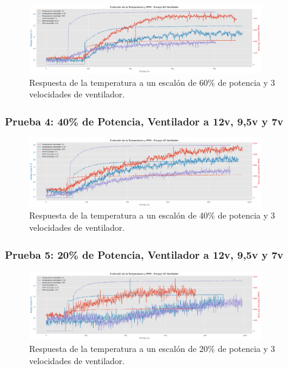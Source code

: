 \documentclass[spanish, a4paper, 11pt]{article}
\begin{document}
\begin{figure}[ht]
    \centering
    \includegraphics[width=0.9\textwidth]{./figures/ventilador_60.png}
    \caption{Respuesta de la temperatura a un escalón de 60\% de potencia y 3 velocidades de ventilador.}
\end{figure}
\FloatBarrier

\subsubsection{Prueba 4: 40\% de Potencia, Ventilador a 12v, 9,5v y 7v}

\begin{figure}[ht]
    \centering
    \includegraphics[width=0.9\textwidth]{./figures/ventilador_40.png}
    \caption{Respuesta de la temperatura a un escalón de 40\% de potencia y 3 velocidades de ventilador.}
\end{figure}
\FloatBarrier

\subsubsection{Prueba 5: 20\% de Potencia, Ventilador a 12v, 9,5v y 7v}

\begin{figure}[ht]
    \centering
    \includegraphics[width=0.9\textwidth]{./figures/ventilador_20.png}
    \caption{Respuesta de la temperatura a un escalón de 20\% de potencia y 3 velocidades de ventilador.}
\end{figure}
\FloatBarrier
\end{document}
